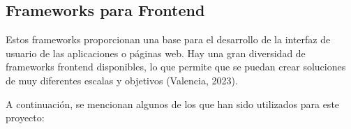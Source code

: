 \subsection{Frameworks para Frontend}
Estos frameworks proporcionan una base para el desarrollo de la interfaz de usuario de las aplicaciones o páginas web. Hay una gran diversidad de frameworks frontend disponibles, lo que permite que se puedan crear soluciones de muy diferentes escalas y objetivos (Valencia, 2023).

A continuación, se mencionan algunos de los que han sido utilizados para este proyecto:
    
    
    